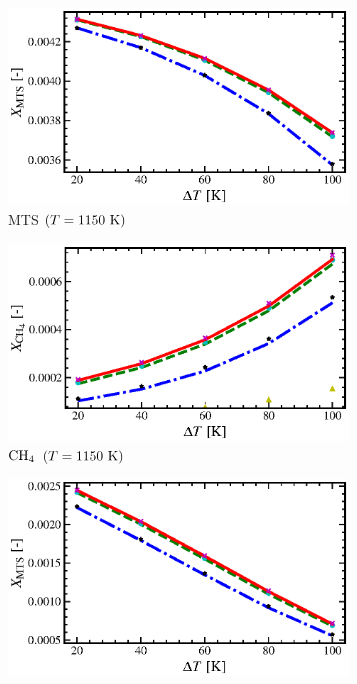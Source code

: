 \documentclass[final, letterpaper, square, comma, numbers, sort&compress]{elsarticle}
\begin{document}
\begin{figure}
    \centering
    \begin{subfigure}{0.49\textwidth}
        \centering
        \includegraphics[width=0.99\textwidth]{dT-vs-MTS-T-1150-compare}
        \caption{MTS $(T=1150\rm\ K)$}
    \end{subfigure}
    \begin{subfigure}{0.49\textwidth}
        \centering
        \includegraphics[width=0.99\textwidth]{dT-vs-CH4-T-1150-compare}
        \caption{$\rm CH_4$ $(T=1150\rm\ K)$}
    \end{subfigure}
    \begin{subfigure}{0.49\textwidth}
        \centering
        \includegraphics[width=0.99\textwidth]{dT-vs-MTS-T-1250-compare}

\end{subfigure}
\end{figure}
\end{document}
